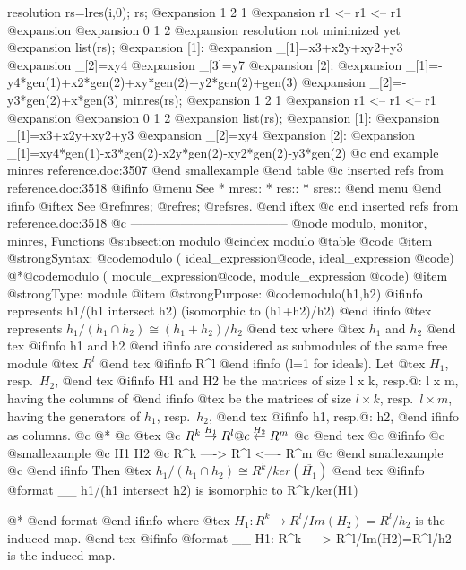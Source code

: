 {  resolution rs=lres(i,0);
  rs;
@expansion{}   1       2       1       
@expansion{} r1 <--  r1 <--  r1
@expansion{} 
@expansion{} 0       1       2       
@expansion{} resolution not minimized yet
@expansion{} 
  list(rs);
@expansion{} [1]:
@expansion{}    _[1]=x3+x2y+xy2+y3
@expansion{}    _[2]=xy4
@expansion{}    _[3]=y7
@expansion{} [2]:
@expansion{}    _[1]=-y4*gen(1)+x2*gen(2)+xy*gen(2)+y2*gen(2)+gen(3)
@expansion{}    _[2]=-y3*gen(2)+x*gen(3)
  minres(rs);
@expansion{}   1       2       1       
@expansion{} r1 <--  r1 <--  r1
@expansion{} 
@expansion{} 0       1       2       
@expansion{} 
  list(rs);
@expansion{} [1]:
@expansion{}    _[1]=x3+x2y+xy2+y3
@expansion{}    _[2]=xy4
@expansion{} [2]:
@expansion{}    _[1]=xy4*gen(1)-x3*gen(2)-x2y*gen(2)-xy2*gen(2)-y3*gen(2)
@c end example minres reference.doc:3507
@end smallexample
@end table
@c inserted refs from reference.doc:3518
@ifinfo
@menu
See
* mres::
* res::
* sres::
@end menu
@end ifinfo
@iftex
See
@ref{mres};
@ref{res};
@ref{sres}.
@end iftex
@c end inserted refs from reference.doc:3518
@c --------------------------------------
@node modulo, monitor, minres, Functions
@subsection modulo
@cindex modulo
@table @code
@item @strong{Syntax:}
@code{modulo (} ideal_expression@code{,} ideal_expression @code{)}
@*@code{modulo (} module_expression@code{,} module_expression @code{)}
@item @strong{Type:}
module
@item @strong{Purpose:}
@code{modulo(h1,h2)}
@ifinfo
represents h1/(h1 intersect h2) (isomorphic to (h1+h2)/h2)
@end ifinfo
@tex
represents $h_1/(h_1 \cap h_2) \cong (h_1+h_2)/h_2$
@end tex
where
@tex
$h_1$ and $h_2$
@end tex
@ifinfo
h1 and h2
@end ifinfo
are considered as submodules of the same free module
@tex
$R^l$
@end tex
@ifinfo
R^l
@end ifinfo
(l=1 for ideals). Let
@tex
$H_1$, resp.\ $H_2$,
@end tex
@ifinfo
H1 and H2
be the matrices of size l x k, resp.@: l x m, having the columns of
@end ifinfo
@tex
be the matrices of size $l \times k$, resp.\ $l \times m$, having the
generators of $h_1$, resp.\ $h_2$,
@end tex
@ifinfo
h1, resp.@: h2,
@end ifinfo
as columns.
@c @*
@c @tex
@c $R^k \buildrel{H_1}\over{\rightarrow} R^l
@c \buildrel{H_2}\over{\leftarrow} R^m$
@c @end tex
@c @ifinfo
@c @smallexample
@c      H1         H2
@c R^k ----> R^l <---- R^m
@c @end smallexample
@c @end ifinfo
Then
@tex
$h_1/(h_1 \cap h_2) \cong R^k / ker(\overline{H_1})$
@end tex
@ifinfo
@format
                                                    __
      h1/(h1 intersect h2) is isomorphic to R^k/ker(H1)

@*
@end format
@end ifinfo
where
@tex
$\overline{H_1}: R^k \rightarrow R^l/Im(H_2)=R^l/h_2$
is the induced map.
@end tex
@ifinfo
@format
         __
         H1: R^k ----> R^l/Im(H2)=R^l/h2 is the induced map.

}
